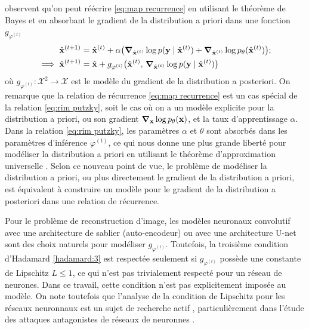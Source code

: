 \citet{Putzky2017} observent qu'on peut réécrire \eqref{eq:map recurrence} en utilisant le théorème de Bayes et 
en absorbant le gradient de la distribution a priori dans une fonction $g_{\varphi^{(t)}}$
\begin{align}
        \hat{\mathbf{x}}^{(t+1)} &= 
        \hat{\mathbf{x}}^{(t)} + \alpha \big( \grad_{\hat{\mathbf{x}}^{(t)}}\log p(\mathbf{y} \mid \hat{\mathbf{x}}^{(t)}) 
        +  \grad_{\hat{\mathbf{x}}^{(t)}}\log p_\theta(\hat{\mathbf{x}}^{(t)})\big);\\
        \label{eq:rim putzky}
        \implies \hat{\mathbf{x}}^{(t+1)} &= \hat{\mathbf{x}} + g_{\varphi^{(t)}}\big(\hat{\mathbf{x}}^{(t)},\, \grad_{\hat{\mathbf{x}}^{(t)}} \log p(\mathbf{y} \mid \hat{\mathbf{x}}^{(t)})\big)
\end{align}
où $g_{\varphi^{(t)}}: \mathcal{X}^{2} \rightarrow \mathcal{X}$ est le modèle du gradient de la distribution 
a posteriori. 
On remarque que la relation de récurrence \eqref{eq:map recurrence} est un cas spécial de la relation \eqref{eq:rim putzky}, 
soit le cas où on a un modèle explicite pour la distribution a priori, ou son gradient $\grad_{\mathbf{x}} \log p_\theta(\mathbf{x})$,
et la taux d'apprentissage $\alpha$. 
Dans la relation \eqref{eq:rim putzky}, les paramètres $\alpha$ et $\theta$ sont absorbés dans les paramètres d'inférence $\varphi^{(t)}$, ce qui nous donne 
une plus grande liberté pour modéliser la distribution a priori en utilisant le théorème d'approximation universelle \citep{Cybenko1989,Hornik1991}. 
Selon ce nouveau point de vue, 
le problème de modéliser la distribution a priori, ou plus directement le gradient de la distribution a priori, 
est équivalent à construire un modèle pour le gradient de la distribution a posteriori dans une relation 
de récurrence.

Pour le problème de reconstruction d'image, les modèles neuronaux convolutif avec une architecture de sablier (auto-encodeur) ou 
avec une architecture U-net \citep{Ronneberger2015} sont des choix naturels pour modéliser $g_{\varphi^{(t)}}$. 
Toutefois, la troisième condition d'Hadamard \ref{hadamard:3} est respectée seulement si $g_{\varphi^{(t)}}$ 
possède une constante de Lipschitz $L\leq 1$, ce qui n'est pas trivialement respecté pour un réseau de neurones.
Dans ce travail, cette condition n'est pas explicitement imposée au modèle.  
On note toutefois que l'analyse de la condition de Lipschitz pour les réseaux neuronnaux est un 
sujet de recherche actif \citep[e.g.][]{}, particulièrement dans l'étude des attaques antagonistes de réseaux de neuronnes \citep[e.g.][]{}. 

